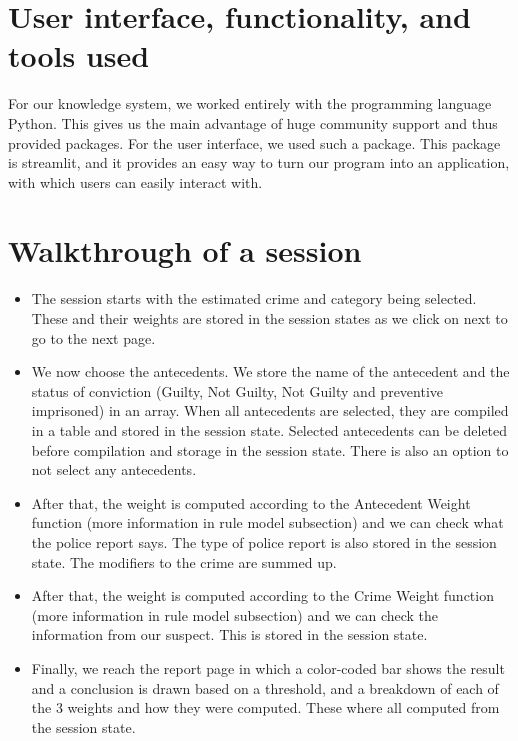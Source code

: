 \documentclass{article}
\begin{document}
\section{User interface, functionality, and tools used}
For our knowledge system, we worked entirely with the programming language Python. This gives us the main advantage of huge community support and thus provided packages. For the user interface, we used such a package. This package is streamlit, and it provides an easy way to turn our program into an application, with which users can easily interact with.

\section{Walkthrough of a session} 
\begin{itemize}
    \item The session starts with the estimated crime and category being selected. These and their weights are stored in the session states as we click on next to go to the next page.
    \item We now choose the antecedents. We store the name of the antecedent and the status of conviction (Guilty, Not Guilty, Not Guilty and preventive imprisoned) in an array. When all antecedents are selected, they are compiled in a table and stored in the session state. Selected antecedents can be deleted before compilation and storage in the session state. There is also an option to not select any antecedents.
    \item After that, the weight is computed according to the Antecedent Weight function (more information in rule model subsection) and we can check what the police report says. The type of police report is also stored in the session state. The modifiers to the crime are summed up. 
    \item After that, the weight is computed according to the Crime Weight function (more information in rule model subsection) and we can check the information from our suspect. This is stored in the session state.
    \item Finally, we reach the report page in which a color-coded bar shows the result and a conclusion is drawn based on a threshold, and a breakdown of each of the 3 weights and how they were computed. These where all computed from the session state.
\end{itemize}
\end{document}
